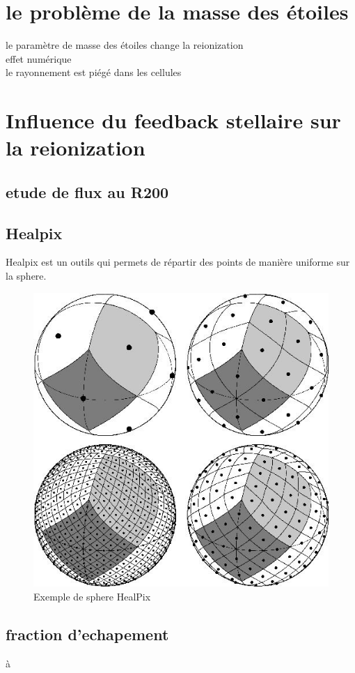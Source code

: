 \section{le problème de la masse des étoiles}

le paramètre de masse des étoiles change la reionization\\
effet numérique\\
le rayonnement est piégé dans les cellules\\






\section{Influence du feedback stellaire sur la reionization}

\subsection{etude de flux au R200}

\subsection{Healpix}
\label{sec:healpix}

Healpix est un outils qui permets de répartir des points de manière uniforme sur la sphere.

\begin{figure}[bth]
        \includegraphics[width=.95\linewidth]{img/03/healpix.jpg} 
        \caption{Exemple de sphere HealPix}
 		\label{fig:HealPix}
\end{figure}



\subsection{fraction d'echapement}à

